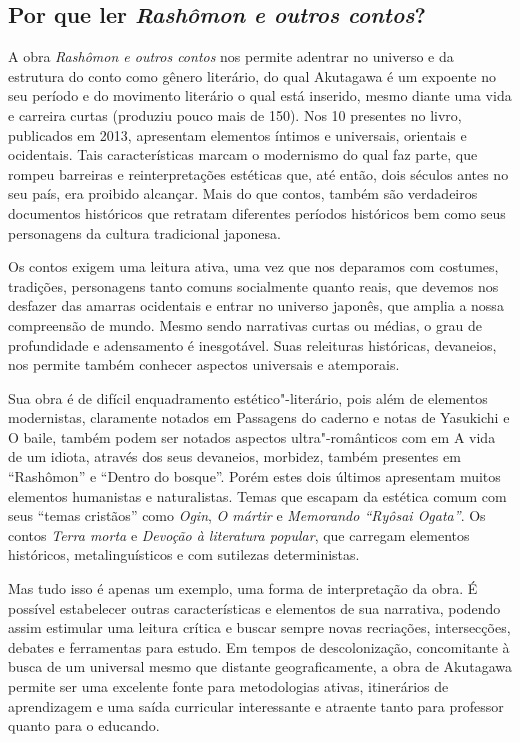 \documentclass[12pt]{extarticle}
\begin{document}


\subsection{Por que ler \textit{Rashômon e outros contos}?}

A obra \emph{Rashômon e outros contos} nos permite adentrar no universo e da estrutura
do conto como gênero literário, do qual Akutagawa é um expoente no seu período
e do movimento literário o qual está inserido, mesmo diante uma vida e carreira
curtas (produziu pouco mais de 150).  Nos 10 presentes no livro, publicados em
2013, apresentam elementos íntimos e universais, orientais e ocidentais. Tais
características marcam o modernismo do qual faz parte, que rompeu barreiras e
reinterpretações estéticas que, até então, dois séculos antes no seu país, era
proibido alcançar. Mais do que contos, também são verdadeiros documentos
históricos que retratam diferentes períodos históricos bem como seus
personagens da cultura tradicional japonesa.

Os contos exigem uma leitura ativa, uma vez que nos deparamos com costumes,
tradições, personagens tanto comuns socialmente quanto reais, que devemos nos
desfazer das amarras ocidentais e entrar no universo japonês, que amplia a
nossa compreensão de mundo. Mesmo sendo narrativas curtas ou médias, o grau de
profundidade e adensamento é inesgotável.  Suas releituras históricas,
devaneios, nos permite também conhecer aspectos universais e atemporais.

Sua obra é de difícil enquadramento estético"-literário, pois além de elementos
modernistas, claramente notados em Passagens do caderno e notas de Yasukichi e
O baile, também podem ser notados aspectos ultra"-românticos com em A vida de
um idiota, através dos seus devaneios, morbidez, também presentes em ``Rashômon'' e
``Dentro do bosque''. Porém estes dois últimos apresentam muitos elementos
humanistas e naturalistas.  Temas que escapam da estética comum com seus
``temas cristãos'' como \textit{Ogin}, \textit{O mártir} e \textit{Memorando ``Ryôsai Ogata''}. Os contos
\textit{Terra morta} e \textit{Devoção à literatura popular}, que carregam elementos históricos,
metalinguísticos e com sutilezas deterministas.

Mas tudo isso é apenas um exemplo, uma forma de interpretação da obra. É
possível estabelecer outras características e elementos de sua narrativa,
podendo assim estimular uma leitura crítica e buscar sempre novas recriações,
intersecções, debates e ferramentas para estudo. Em tempos de descolonização,
concomitante à busca de um universal mesmo que distante geograficamente, a obra
de Akutagawa permite ser uma excelente fonte para metodologias ativas,
itinerários de aprendizagem e uma saída curricular interessante e atraente
tanto para professor quanto para o educando.
\end{document}
